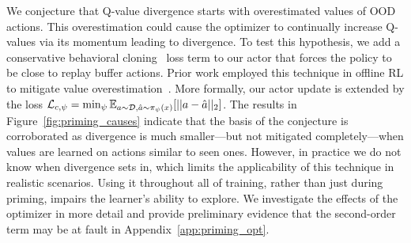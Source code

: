 We conjecture that Q-value divergence starts with overestimated values of OOD actions. This overestimation could cause the optimizer to continually increase Q-values via its momentum leading to divergence. 
To test this hypothesis, we add a conservative behavioral cloning~\parencite{pomerleau1988alvinn, atkeson1997robot} loss term to our actor that forces the policy to be close to replay buffer actions. Prior work employed this technique in offline RL to mitigate value overestimation~\parencite{fujimoto2021td3bc}. More formally, our actor update is extended by the loss $
        \mathcal{L}_{c, \psi} = \min_{\psi} \mathbb{E}_{a \sim \mathcal{D}, \hat{a} \sim \pi_{\psi}(x)}[||a - \hat{a}||_2]$. 
The results in Figure~\ref{fig:priming_causes} indicate that the basis of the conjecture is corroborated as divergence is much smaller---but not mitigated completely---when values are learned on actions similar to seen ones. However, in practice we do not know when divergence sets in, which limits the applicability of this technique in realistic scenarios. Using it throughout all of training, rather than just during priming, impairs the learner's ability to explore. We investigate the effects of the optimizer in more detail and provide preliminary evidence that the second-order term may be at fault in Appendix~\ref{app:priming_opt}. 



